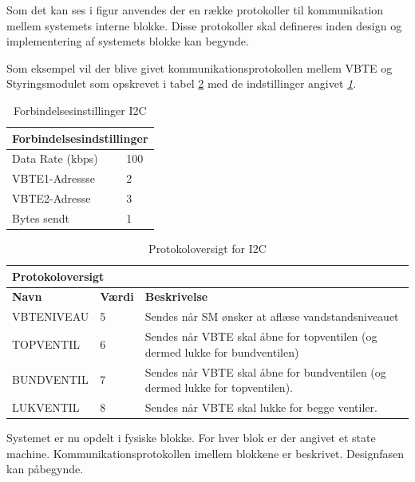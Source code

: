 Som det kan ses i figur anvendes der en række protokoller til kommunikation mellem systemets interne blokke. Disse protokoller skal defineres inden design og implementering af systemets blokke kan begynde.

Som eksempel vil der blive givet kommunikationsprotokollen mellem VBTE og Styringsmodulet som opskrevet i tabel \ref{tabel:protokoloversigt} med de indstillinger angivet \textit{\ref{tabel:forbindelsesindstillinger}}.


\begin{table}[H]
\centering
\begin{tabular}{|l|l|}
\multicolumn{2}{l}{{\Large Forbindelsesindstillinger}} \\\hline
Data Rate (kbps)&100\\\hline
VBTE1-Adressse&2\\\hline
VBTE2-Adresse&3\\\hline
Bytes sendt&1\\\hline
\end{tabular}
\caption{Forbindelsesinstillinger I2C}
\label{tabel:forbindelsesindstillinger}
\end{table}

\begin{table}[htbp]
\centering
\begin{tabular}{|l|l|p{10cm}|}
\multicolumn{2}{l}{{\Large Protokoloversigt}} \\\hline
\textbf{Navn} &\textbf{Værdi} &\textbf{Beskrivelse}\\\hline
VBTENIVEAU&5&Sendes når SM ønsker at aflæse vandstandsniveauet\\\hline
TOPVENTIL&6&Sendes når VBTE skal åbne for topventilen (og dermed lukke for bundventilen)\\\hline
BUNDVENTIL&7&Sendes når VBTE skal åbne for bundventilen (og dermed lukke for topventilen).\\\hline
LUKVENTIL&8&Sendes når VBTE skal lukke for begge ventiler.\\\hline
\end{tabular}
\caption{Protokoloversigt for I2C}
\label{tabel:protokoloversigt}
\end{table}

Systemet er nu opdelt i fysiske blokke. For hver blok er der angivet et state machine. Kommunikationsprotokollen imellem blokkene er beskrivet. Designfasen kan påbegynde.




